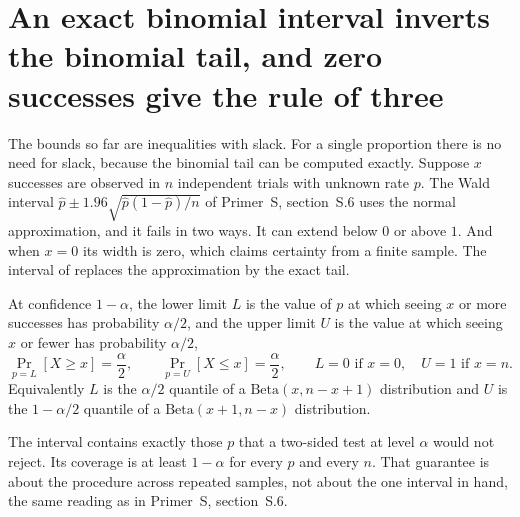 

\section{An exact binomial interval inverts the binomial tail, and zero successes give the rule of three}\label{sec:ch12:cp}

The bounds so far are inequalities with slack. For a single proportion there is no need for slack, because the binomial tail can be computed exactly. Suppose $x$ successes are observed in $n$ independent trials with unknown rate $p$. The Wald interval $\hat p\pm1.96\sqrt{\hat p(1-\hat p)/n}$ of Primer~S, section~S.6 uses the normal approximation, and it fails in two ways. It can extend below $0$ or above $1$. And when $x=0$ its width is zero, which claims certainty from a finite sample. The interval of \citet{clopperpearson1934} replaces the approximation by the exact tail.

\begin{definition}\label{def:ch12:cp}
At confidence $1-\alpha$, the lower limit $L$ is the value of $p$ at which seeing $x$ or more successes has probability $\alpha/2$, and the upper limit $U$ is the value at which seeing $x$ or fewer has probability $\alpha/2$,
\begin{equation}
\Pr_{p=L}[X\ge x]=\frac\alpha2,\qquad \Pr_{p=U}[X\le x]=\frac\alpha2,
\qquad L=0\text{ if }x=0,\quad U=1\text{ if }x=n.
\label{eq:ch12:cp}
\end{equation}
Equivalently $L$ is the $\alpha/2$ quantile of a $\mathrm{Beta}(x,n-x+1)$ distribution and $U$ is the $1-\alpha/2$ quantile of a $\mathrm{Beta}(x+1,n-x)$ distribution.
\end{definition}
The interval contains exactly those $p$ that a two-sided test at level $\alpha$ would not reject. Its coverage is at least $1-\alpha$ for every $p$ and every $n$. That guarantee is about the procedure across repeated samples, not about the one interval in hand, the same reading as in Primer~S, section~S.6.

